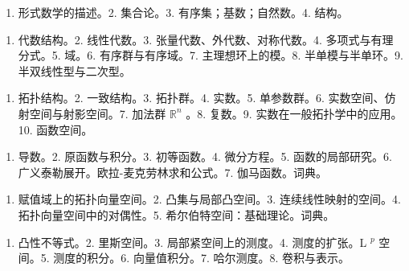 \begin{enumerate}
\def\labelenumi{\arabic{enumi}.}
\tightlist
\item
  形式数学的描述。2. 集合论。3. 有序集；基数；自然数。4. 结构。
\end{enumerate}


\begin{enumerate}
\def\labelenumi{\arabic{enumi}.}
\tightlist
\item
  代数结构。2. 线性代数。3. 张量代数、外代数、对称代数。4. 多项式与有理分式。5. 域。6. 有序群与有序域。7. 主理想环上的模。8. 半单模与半单环。9. 半双线性型与二次型。
\end{enumerate}


\begin{enumerate}
\def\labelenumi{\arabic{enumi}.}
\tightlist
\item
  拓扑结构。2. 一致结构。3. 拓扑群。4. 实数。5. 单参数群。6. 实数空间、仿射空间与射影空间。7. 加法群 \(\mathbb{R}^n\) 。8. 复数。9. 实数在一般拓扑学中的应用。10. 函数空间。
\end{enumerate}


\begin{enumerate}
\def\labelenumi{\arabic{enumi}.}
\tightlist
\item
  导数。2. 原函数与积分。3. 初等函数。4. 微分方程。5. 函数的局部研究。6. 广义泰勒展开。欧拉-麦克劳林求和公式。7. 伽马函数。词典。
\end{enumerate}


\begin{enumerate}
\def\labelenumi{\arabic{enumi}.}
\tightlist
\item
  赋值域上的拓扑向量空间。2. 凸集与局部凸空间。3. 连续线性映射的空间。4. 拓扑向量空间中的对偶性。5. 希尔伯特空间：基础理论。词典。
\end{enumerate}


\begin{enumerate}
\def\labelenumi{\arabic{enumi}.}
\tightlist
\item
  凸性不等式。2. 里斯空间。3. 局部紧空间上的测度。4. 测度的扩张。L \(^{p}\) 空间。5. 测度的积分。6. 向量值积分。7. 哈尔测度。8. 卷积与表示。
\end{enumerate}

